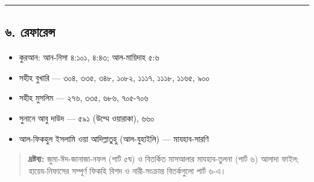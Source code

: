 \medskip\hrule\medskip

\subsection*{৬. রেফারেন্স}

\begin{itemize}
\item কুরআন: আন-নিসা ৪:১০১, ৪:৪৩; আল-মায়িদাহ ৫:৬
\item সহীহ বুখারি — ৩০৪, ৩৩৫, ৩৪৮, ১০৮২, ১১১৭, ১১১৮, ১১৬৫, ৯০০
\item সহীহ মুসলিম — ২৭৬, ৩৩৫, ৬৮৬, ৭০৫-৭০৬
\item সুনানে আবু দাউদ — ৫৯১ (উম্মে ওয়ারাকা), ৬৬০
\item আল-ফিকহুল ইসলামি ওয়া আদিল্লাতুহু (আল-যুহাইলি) — মাযহাব-সারণি
\end{itemize}
\begin{quote}
\textbf{দ্রষ্টব্য:} জুমা-ঈদ-জানাজা-নফল (পার্ট ৫ঘ) ও বিতর্কিত মাসআলার মাযহাব-তুলনা (পার্ট ৬) আলাদা ফাইল; হায়েয-নিফাসের সম্পূর্ণ ফিকহি বিশদ ও নারী-সংক্রান্ত বিতর্কগুলো পার্ট ৬-এ।
\end{quote}


